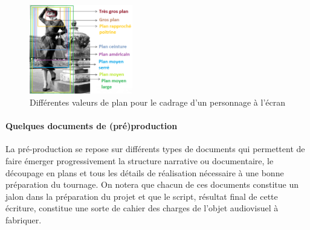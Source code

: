 \begin{figure}[ht!]
\centering
\includegraphics[width=0.4\textwidth]{./images/ValeurPlan-v1.png}
\caption{Différentes valeurs de plan pour le cadrage d'un personnage à l'écran}
\label{img:intro:plans}
\end{figure}


\paragraph{Quelques documents de (pré)production}
La pré-production se repose sur différents types de documents qui permettent de faire émerger progressivement la structure narrative ou documentaire, le découpage en plans et tous les détails de réalisation nécessaire à une bonne préparation du tournage. 
On notera que chacun de ces documents constitue un jalon dans la préparation du projet et que le script, résultat final de cette écriture, constitue une sorte de cahier des charges de l'objet audiovisuel à fabriquer.
